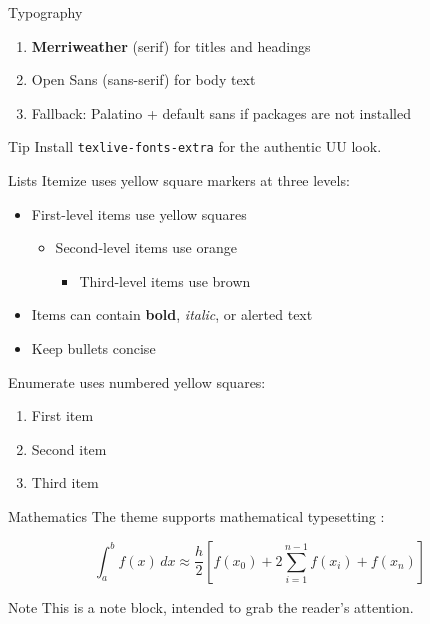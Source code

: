 \documentclass[aspectratio=169,10pt]{beamer}
\begin{document}
\begin{frame}{Typography}
  \begin{enumerate}
    \item \textbf{Merriweather} (serif) for titles and headings
    \item \textsf{Open Sans} (sans-serif) for body text
    \item Fallback: Palatino + default sans if packages are not installed
  \end{enumerate}

  \vskip 10pt
  \begin{exampleblock}{Tip}
    Install \texttt{texlive-fonts-extra} for the authentic UU look.
  \end{exampleblock}
\end{frame}

\begin{frame}{Lists}
  Itemize uses yellow square markers at three levels:

  \begin{itemize}
    \item First-level items use \textcolor{UUyellow}{yellow} squares
    \begin{itemize}
      \item Second-level items use \textcolor{UUorange}{orange}
      \begin{itemize}
        \item Third-level items use \textcolor{UUbrown}{brown}
      \end{itemize}
    \end{itemize}
    \item Items can contain \textbf{bold}, \emph{italic}, or \alert{alerted} text
    \item Keep bullets concise
  \end{itemize}

  \vskip 8pt
  Enumerate uses numbered yellow squares:
  \begin{enumerate}
    \item First item
    \item Second item
    \item Third item
  \end{enumerate}
\end{frame}

\begin{frame}{Mathematics}
  The theme supports mathematical typesetting \cite{tai1994mathematical}:

$$
\int_{a}^{b} f(x)\,dx \approx 
\frac{h}{2}\left[f(x_0) + 2\sum_{i=1}^{n-1} f(x_i) + f(x_n)\right]
$$

  \begin{alertblock}{Note}
    This is a note block, intended to grab the reader's attention.
  \end{alertblock}
\end{frame}
\end{document}
